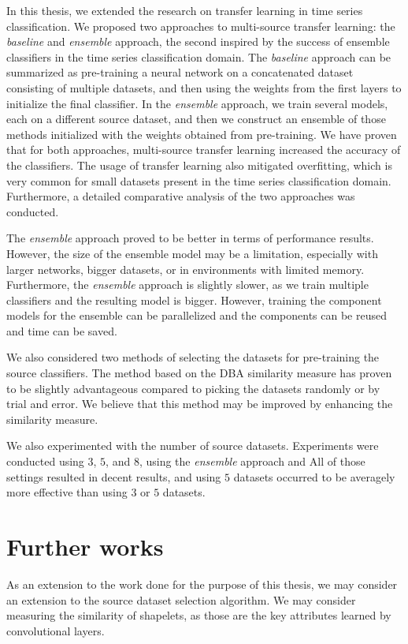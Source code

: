\documentclass[a4paper,11pt,twoside]{report}
\theoremstyle{definition}
\begin{document}
In this thesis, we extended the research on transfer learning in time series classification. We proposed two approaches to multi-source transfer learning: the \textit{baseline} and \textit{ensemble} approach, the second inspired by the success of ensemble classifiers in the time series classification domain. The \textit{baseline} approach can be summarized as pre-training a neural network on a concatenated dataset consisting of multiple datasets, and then using the  weights from the first layers to initialize the final classifier. In the \textit{ensemble} approach, we train several models, each on a different source dataset, and then we construct an ensemble of those methods initialized with the weights obtained from pre-training. We have proven that for both approaches, multi-source transfer learning increased the accuracy of the classifiers. The usage of transfer learning also mitigated overfitting, which is very common for small datasets present in the time series classification domain. Furthermore, a detailed comparative analysis of the two approaches was conducted.

The \textit{ensemble} approach proved to be better in terms of performance results. However, the size of the ensemble model may be a limitation, especially with larger networks, bigger datasets, or in environments with limited memory. Furthermore, the \textit{ensemble} approach is slightly slower, as we train multiple classifiers and the resulting model is bigger. However, training the component models for the ensemble can be parallelized and the components can be reused and time can be saved.


We also considered two methods of selecting the datasets for pre-training the source classifiers. The method based on the DBA similarity measure has proven to be slightly advantageous compared to picking the datasets randomly or by trial and error. We believe that this method may be improved by enhancing the similarity measure.

We also  experimented with the number of source datasets. Experiments were conducted using $3$, $5$, and $8$, using the \textit{ensemble} approach and  All of those settings resulted in decent results, and using $5$ datasets occurred to be averagely more effective than using $3$ or $5$ datasets.

\section{Further works}
As an extension to the work done for the purpose of this thesis, we may consider an extension to the source dataset selection algorithm. We may consider measuring the similarity of shapelets, as those are the key attributes learned by convolutional layers.
\end{document}
